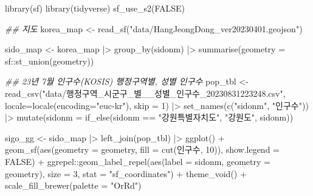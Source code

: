 \documentclass[
  a4paper,showtrims,openright,hidelinks]{oblivoir}
\newenvironment{Shaded}{\begin{snugshade}}{\end{snugshade}}
\newcommand{\AttributeTok}[1]{\textcolor[rgb]{0.40,0.45,0.13}{#1}}
\newcommand{\ConstantTok}[1]{\textcolor[rgb]{0.56,0.35,0.01}{#1}}
\newcommand{\DecValTok}[1]{\textcolor[rgb]{0.68,0.00,0.00}{#1}}
\newcommand{\DocumentationTok}[1]{\textcolor[rgb]{0.37,0.37,0.37}{\textit{#1}}}
\newcommand{\FunctionTok}[1]{\textcolor[rgb]{0.28,0.35,0.67}{#1}}
\newcommand{\NormalTok}[1]{\textcolor[rgb]{0.00,0.23,0.31}{#1}}
\newcommand{\OtherTok}[1]{\textcolor[rgb]{0.00,0.23,0.31}{#1}}
\newcommand{\SpecialCharTok}[1]{\textcolor[rgb]{0.37,0.37,0.37}{#1}}
\newcommand{\StringTok}[1]{\textcolor[rgb]{0.13,0.47,0.30}{#1}}
\begin{document}
\begin{Shaded}
\begin{Highlighting}[]
\FunctionTok{library}\NormalTok{(sf)}
\FunctionTok{library}\NormalTok{(tidyverse)}
\FunctionTok{sf\_use\_s2}\NormalTok{(}\ConstantTok{FALSE}\NormalTok{)}

\DocumentationTok{\#\# 지도}
\NormalTok{korea\_map }\OtherTok{\textless{}{-}} \FunctionTok{read\_sf}\NormalTok{(}\StringTok{"data/HangJeongDong\_ver20230401.geojson"}\NormalTok{)}

\NormalTok{sido\_map }\OtherTok{\textless{}{-}}\NormalTok{ korea\_map }\SpecialCharTok{|\textgreater{}} 
  \FunctionTok{group\_by}\NormalTok{(sidonm) }\SpecialCharTok{|\textgreater{}} 
  \FunctionTok{summarise}\NormalTok{(}\AttributeTok{geometry =}\NormalTok{ sf}\SpecialCharTok{::}\FunctionTok{st\_union}\NormalTok{(geometry))}

\DocumentationTok{\#\# 23년 7월 인구수(KOSIS) 행정구역별, 성별 인구수}
\NormalTok{pop\_tbl }\OtherTok{\textless{}{-}} \FunctionTok{read\_csv}\NormalTok{(}\StringTok{"data/행정구역\_시군구\_별\_\_성별\_인구수\_20230831223248.csv"}\NormalTok{,}
         \AttributeTok{locale=}\FunctionTok{locale}\NormalTok{(}\AttributeTok{encoding=}\StringTok{"euc{-}kr"}\NormalTok{), }\AttributeTok{skip =} \DecValTok{1}\NormalTok{) }\SpecialCharTok{|\textgreater{}} 
  \FunctionTok{set\_names}\NormalTok{(}\FunctionTok{c}\NormalTok{(}\StringTok{"sidonm"}\NormalTok{, }\StringTok{"인구수"}\NormalTok{)) }\SpecialCharTok{|\textgreater{}} 
  \FunctionTok{mutate}\NormalTok{(}\AttributeTok{sidonm =} \FunctionTok{if\_else}\NormalTok{(sidonm }\SpecialCharTok{==} \StringTok{"강원특별자치도"}\NormalTok{, }\StringTok{"강원도"}\NormalTok{, sidonm))}

\NormalTok{sigo\_gg }\OtherTok{\textless{}{-}}\NormalTok{ sido\_map }\SpecialCharTok{|\textgreater{}} 
  \FunctionTok{left\_join}\NormalTok{(pop\_tbl) }\SpecialCharTok{|\textgreater{}} 
  \FunctionTok{ggplot}\NormalTok{() }\SpecialCharTok{+}
    \FunctionTok{geom\_sf}\NormalTok{(}\FunctionTok{aes}\NormalTok{(}\AttributeTok{geometry =}\NormalTok{ geometry, }\AttributeTok{fill =} \FunctionTok{cut}\NormalTok{(인구수, }\DecValTok{10}\NormalTok{)), }\AttributeTok{show.legend =} \ConstantTok{FALSE}\NormalTok{) }\SpecialCharTok{+}
\NormalTok{    ggrepel}\SpecialCharTok{::}\FunctionTok{geom\_label\_repel}\NormalTok{(}\FunctionTok{aes}\NormalTok{(}\AttributeTok{label =}\NormalTok{ sidonm, }\AttributeTok{geometry =}\NormalTok{ geometry), }
                              \AttributeTok{size =} \DecValTok{3}\NormalTok{, }\AttributeTok{stat =} \StringTok{"sf\_coordinates"}\NormalTok{) }\SpecialCharTok{+}
    \FunctionTok{theme\_void}\NormalTok{() }\SpecialCharTok{+}
    \FunctionTok{scale\_fill\_brewer}\NormalTok{(}\AttributeTok{palette =} \StringTok{"OrRd"}\NormalTok{)}


\end{Highlighting}
\end{Shaded}
\end{document}
